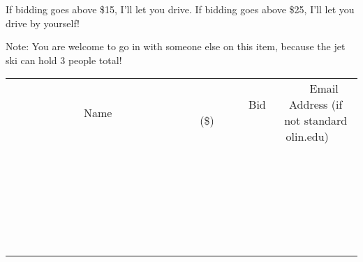 \documentclass[11pt]{article}
\begin{document}
If bidding goes above \$15, I'll let you drive. If bidding goes above \$25, I'll let you drive by yourself! 

Note: You are welcome to go in with someone else on this item, because the jet ski can hold 3 people total!
\\[6ex]
\begin{tabular}{c c c}
~~~~~~~~~~~~~Name~~~~~~~~~~~~~ & ~~~~~~~~~Bid (\$)~~~~~~~~~  & ~~~Email Address (if not standard olin.edu)~~~\\
 & & \\
\hline
 & & \\
\hline
 & & \\
\hline
 & & \\
\hline
 & & \\
\hline
 & & \\
\hline
 & & \\
\hline
 & & \\
\hline
 & & \\
\hline
 & & \\
\hline
 & & \\
\hline
 & & \\
\hline
 & & \\
\hline
 & & \\
\hline
 & & \\
\hline
 & & \\
\hline
 & & \\
\hline
 & & \\
\hline
 & & \\
\hline
 & & \\
\hline
 & & \\
\hline
 & & \\
\hline
 & & \\
\hline
 & & \\
\hline
 & & \\
\hline
 & & \\
\hline
\end{tabular}
\newpage
\end{document}
